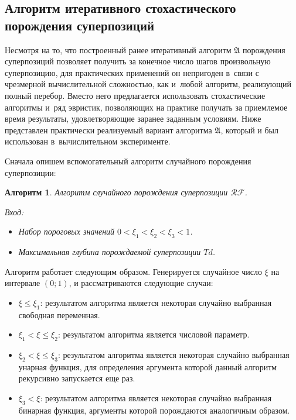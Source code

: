 \documentclass[12pt,a4paper]{article}
\newtheorem{algo}{Алгоритм}
\begin{document}
\subsection{Алгоритм итеративного стохастического порождения суперпозиций}

Несмотря на то, что построенный ранее итеративный алгоритм $\mathfrak{A}$ порождения
суперпозиций позволяет получить за конечное число шагов произвольную
суперпозицию, для практических применений он непригоден в~связи с чрезмерной
вычислительной сложностью, как и~любой алгоритм, реализующий полный перебор.
Вместо него предлагается использовать стохастические алгоритмы и~ряд эвристик,
позволяющих на практике получать за приемлемое время результаты,
удовлетворяющие заранее заданным условиям. Ниже представлен
практически реализуемый вариант алгоритма $\mathfrak{A}$, который и был использован
в~вычислительном эксперименте.

Сначала опишем вспомогательный алгоритм случайного порождения суперпозиции:

\begin{algo}
  \label{algo:RF}
  Алгоритм случайного порождения суперпозиции $\mathcal{RF}$.

  Вход:
  \begin{itemize}
	\item Набор пороговых значений $0 < \xi_1 < \xi_2 < \xi_3 < 1$.
	\item Максимальная глубина порождаемой суперпозиции $Td$.
  \end{itemize}
\end{algo}

Алгоритм работает следующим образом. Генерируется случайное число $\xi$ на
интервале $(0; 1)$, и рассматриваются следующие случаи:
\begin{itemize}
  \item $\xi \leq \xi_1$: результатом алгоритма является некоторая случайно
	выбранная свободная переменная.
  \item $\xi_1 < \xi \leq \xi_2$: результатом алгоритма является	числовой
	параметр.
  \item $\xi_2 < \xi \leq \xi_3$: результатом алгоритма является некоторая
	случайно выбранная унарная функция, для определения аргумента которой
	данный алгоритм рекурсивно запускается еще раз.
  \item $\xi_3 < \xi$: результатом алгоритма является некоторая случайно
	выбранная бинарная функция, аргументы которой порождаются аналогичным
	образом.
\end{itemize}
\end{document}
